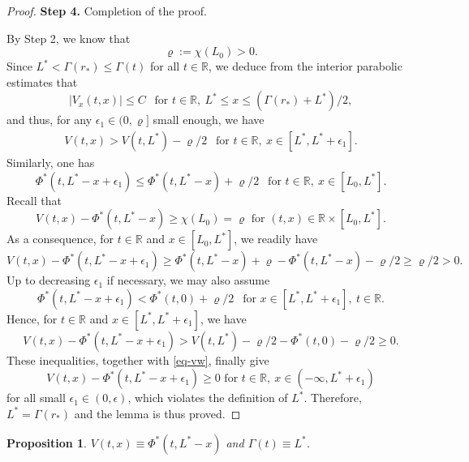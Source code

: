 \documentclass[11pt]{amsart}
\newtheorem{proposition}[theorem]{Proposition}
\numberwithin{equation}{section}
\begin{document}
\begin{proof}
\textbf{Step 4.} Completion of the proof.

By Step 2, we know that
\begin{equation*}
  \varrho:=\chi(L_0)>0.
\end{equation*}
Since $L^*<\Gamma(r_*)\leq \Gamma(t)$ for all $t\in\mathbb R$, we deduce from the  interior parabolic estimates that 
\begin{equation*}
  |V_x(t,x)|\leq C ~~\text{ for } t\in\mathbb R,~ L^*\leq x\leq (\Gamma(r_*)+L^*)/2,
\end{equation*}
and thus, for any $\epsilon_1\in(0,\varrho ]$ small enough, we have
\begin{eqnarray*}
 V(t,x)>V(t,L^*)-\varrho/2 ~~\text{ for }t\in\mathbb R,\  x\in[L^*,L^*+\epsilon_1].
\end{eqnarray*}
Similarly,  one has
\[\Phi^{*}(t,L^*-x+\epsilon_1)\leq \Phi^*(t,L^*-x)+\varrho/2 ~~\text{ for }t\in\mathbb R,\ x\in[L_0, L^*].\]
Recall that 
\begin{equation*}
V(t,x)-\Phi^*(t,L^*-x)\geq \chi (L_0)=\varrho  \text{ for }(t,x)\in\mathbb{R}\times[L_0,L^*].
\end{equation*}
As a consequence, for $t\in\mathbb{R}$ and $x\in[L_0,L^*]$, we readily have 
\begin{equation*}
  V(t,x)-\Phi^*(t,L^*-x+\epsilon_1)\geq \Phi^*(t,L^*-x)+\varrho - \Phi^*(t,L^*-x)-\varrho/2\geq \varrho/2>0.
\end{equation*}
Up to decreasing $\epsilon_1$ if necessary,  we may also assume
\begin{equation*}
  \Phi^*(t,L^*-x+\epsilon_1)<\Phi^*(t,0)+\varrho/2 ~~\text{ for } x\in[L^*,L^*+\epsilon_1],\ t\in\mathbb R.
\end{equation*}
Hence,  for $t\in\mathbb{R}$ and $x\in[L^*,L^*+\epsilon_1]$, we have
\begin{equation*}
  V(t,x)-\Phi^*(t,L^*-x+\epsilon_1)> V(t,L^*)-\varrho /2 - \Phi^*(t,0)-\varrho/2\geq0.
\end{equation*}
These inequalities, together  with \eqref{eq-vw}, finally give 
\begin{equation*}
  V(t,x)-\Phi^*(t,L^*-x+\epsilon_1)\geq0 \text{ for } t\in\mathbb{R},\ x\in(-\infty,L^*+\epsilon_1)
\end{equation*}
for all small $\epsilon_1\in(0,\epsilon)$, which violates the definition of $L^*$. Therefore, $L^*=\Gamma(r_*)$ and the lemma is thus  proved.
\end{proof}

\begin{proposition}
  $V(t,x)\equiv \Phi^*(t,L^*-x)$ and $\Gamma(t)\equiv L^*$.
\end{proposition}
\end{document}
